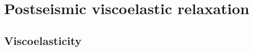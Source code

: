 \documentclass[letterpaper,12pt,]{memoir}
\begin{document}
\clearpage


\chapter{Postseismic viscoelastic relaxation}

\clearpage



\section{Viscoelasticity}
\end{document}
